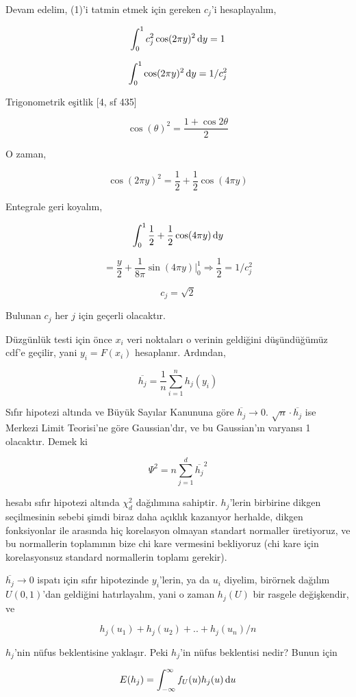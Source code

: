 \documentclass[12pt,fleqn]{article}\usepackage{../../common}
\begin{document}
Devam edelim, (1)'i tatmin etmek için gereken $c_j$'i hesaplayalım,

$$ 
\int_{0}^{1} c_j^2 \cos(2 \pi y)^2 \,\mathrm{d} y = 1
$$

$$ 
\int_{0}^{1}\cos(2 \pi y)^2 \,\mathrm{d} y = 1/c_j^2 
$$


Trigonometrik eşitlik [4, sf 435]

$$ \cos(\theta)^2 = \frac{1 + \cos 2 \theta }{2}$$

O zaman,

$$ 
 \cos(2 \pi y)^2 = \frac{1}{2} + \frac{1}{2}\cos(4 \pi y)
 $$

Entegrale geri koyalım,

$$ 
\int_{0}^{1} \frac{1}{2} + \frac{1}{2}\cos(4 \pi y) \,\mathrm{d} y
$$

$$ 
= \frac{y}{2} + \frac{1}{8\pi}\sin(4 \pi y)  \bigg|_{0}^{1} 
\Rightarrow \frac{1}{2} = 1/c_j^2
$$

$$ c_j = \sqrt{2} $$

Bulunan $c_j$ her $j$ için geçerli olacaktır.

Düzgünlük testi için önce $x_i$ veri noktaları o verinin geldiğini
düşündüğümüz cdf'e geçilir, yani $y_i = F(x_i)$ hesaplanır. Ardından,

$$ \overline{h_j} = \frac{1}{n} \sum_{i=1}^{n} h_j(y_i) $$

Sıfır hipotezi altında ve Büyük Sayılar Kanununa göre $\overline{h_j} \to0$.  
$\sqrt{n} \cdot \overline{h_j}$ ise Merkezi Limit Teorisi'ne göre Gaussian'dır, 
ve bu Gaussian'ın varyansı  1 olacaktır. Demek ki

$$ 
\Psi^2 = n \sum_{j=1}^{d} \overline{h_j}^2
$$

hesabı sıfır hipotezi altında $\chi^2_d$ dağılımına sahiptir. $h_j$'lerin
birbirine dikgen seçilmesinin sebebi şimdi biraz daha açıklık kazanıyor
herhalde, dikgen fonksiyonlar ile arasında hiç korelasyon olmayan standart
normaller üretiyoruz, ve bu normallerin toplamının bize chi kare vermesini
bekliyoruz (chi kare için korelasyonsuz standard normallerin toplamı
gerekir).

$\overline{h_j} \to 0$ ispatı için sıfır hipotezinde $y_i$'lerin, ya da
$u_i$ diyelim, birörnek dağılım $U(0,1)$'dan geldiğini hatırlayalım, yani o
zaman $h_j(U)$ bir rasgele değişkendir, ve

$$ h_j(u_1) + h_j(u_2) + .. + h_j(u_n) / n $$

$h_j$'nin nüfus beklentisine yaklaşır. Peki $h_j$'in nüfus beklentisi
nedir? Bunun için 

$$ E(h_j) = \int_{-\infty}^{\infty} f_U(u)h_j(u) \,\mathrm{d} u $$
\end{document}
